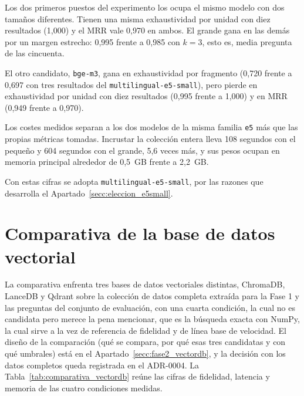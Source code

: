 

Los dos primeros puestos del experimento los ocupa el mismo modelo con dos tamaños diferentes. Tienen una misma exhaustividad por unidad con diez resultados (1,000) y el MRR vale 0,970 en ambos. El grande gana en las demás por un margen estrecho: 0,995 frente a 0,985 con $k=3$, esto es, media pregunta de las cincuenta.

El otro candidato, \texttt{bge-m3}\cite{chen2024m3embedding}, gana en exhaustividad por fragmento (0,720 frente a 0,697 con tres resultados del \texttt{multilingual-e5-small}\cite{wang2024e5multilingue}), pero pierde en exhaustividad por unidad con diez resultados (0,995 frente a 1,000) y en MRR (0,949 frente a 0,970).

Los costes medidos separan a los dos modelos de la misma familia \texttt{e5} más que las propias métricas tomadas. Incrustar la colección entera lleva 108 segundos con el pequeño y 604 segundos con el grande, 5,6 veces más, y sus pesos ocupan en memoria principal alrededor de 0,5~GB frente a 2,2~GB. 

Con estas cifras se adopta \texttt{multilingual-e5-small}, por las
razones que desarrolla el Apartado~\ref{secc:eleccion_e5small}.



\section[Comparativa de la base de datos vectorial]{Comparativa de la base de datos vectorial}
\label{secc:resultados_vectordb}

La comparativa enfrenta tres bases de datos vectoriales distintas, ChromaDB\cite{chromadb}, LanceDB\cite{lancedb} y Qdrant\cite{qdrant} sobre la colección de datos completa extraída para la Fase 1 y las preguntas del conjunto de evaluación, con una cuarta condición, la cual no es candidata pero merece la pena mencionar, que es la búsqueda exacta con NumPy, la cual sirve a la vez de referencia de fidelidad y de línea base de velocidad. El diseño de la comparación (qué se compara, por qué esas tres candidatas y con qué umbrales) está en el Apartado~\ref{secc:fase2_vectordb}, y la decisión con los datos completos queda registrada en el ADR-0004\cite{repo_tfg}.
La Tabla~\ref{tab:comparativa_vectordb} reúne las cifras de fidelidad,
  latencia y memoria de las cuatro condiciones medidas.



